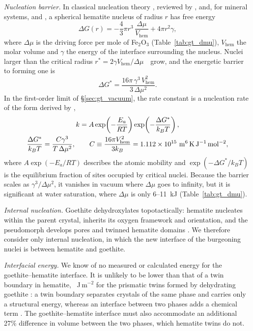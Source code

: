 \textit{Nucleation barrier.} In classical nucleation theory \citep{gibbs1878,volmer1926,becker1935},
reviewed by \citet{christian2002}, \citet{kashchiev2000} and, for mineral systems,
\citet{deyoreo2003} and \citet{lasaga1998}, a spherical hematite nucleus of radius $r$ has free
energy
\begin{equation}
  \Delta G(r) = -\frac{4}{3}\pi r^{3}\,\frac{\Delta\mu}{V_{\mathrm{hem}}} + 4\pi r^{2}\gamma,
\end{equation}
where $\Delta\mu$ is the driving force per mole of Fe$_2$O$_3$ (Table~\ref{tab:gt_dmu}),
$V_{\mathrm{hem}}$ the molar volume and $\gamma$ the energy of the interface surrounding the
nucleus. Nuclei larger than the critical radius $r^{*} = 2\gamma V_{\mathrm{hem}}/\Delta\mu$~~grow,
and the energetic barrier to forming one is
\begin{equation}
  \Delta G^{*} = \frac{16\pi\,\gamma^{3}\,V_{\mathrm{hem}}^{2}}{3\,\Delta\mu^{2}} .
  \label{eq:gt_barrier}
\end{equation}
In the first-order limit of \S\ref{sec:gt_vacuum}, the rate constant is a nucleation rate of the
form derived by \citet{turnbull1949},
\begin{gather}
  k = A\exp\!\left(-\frac{E_a}{RT}\right)\exp\!\left(-\frac{\Delta G^{*}}{k_B T}\right), \notag\\
  \frac{\Delta G^{*}}{k_B T} = \frac{C\gamma^{3}}{T\,\Delta\mu^{2}},
  \qquad
  C \equiv \frac{16\pi V_{\mathrm{hem}}^{2}}{3k_B} = 1.112\times10^{15}~\mathrm{m^6\,K\,J^{-1}\,mol^{-2}} ,
  \label{eq:gt_knuc}
\end{gather}
where $A\exp(-E_a/RT)$ describes the atomic mobility and $\exp(-\Delta G^{*}/k_BT)$ is the
equilibrium fraction of sites occupied by critical nuclei. Because the barrier scales as
$\gamma^3/\Delta\mu^2$, it vanishes in vacuum where $\Delta\mu$ goes to infinity, but it 
is significant at water saturation, where $\Delta\mu$ is only 6--11~kJ
(Table~\ref{tab:gt_dmu}).

\textit{Internal nucleation.} Goethite dehydroxylates topotactically: hematite nucleates within
the parent crystal, inherits its oxygen framework and orientation, and the pseudomorph develops
pores and twinned hematite domains \citep{limadefaria1963,watari1979,watari1983,cudennec2005}.
We therefore consider only internal nucleation, in which the new interface of the burgeoning nuclei is between hematite
and goethite.

\textit{Interfacial energy.} We know of no measured or calculated energy for the goethite--hematite
interface. It is unlikely to be lower than that of a twin boundary in hematite,
\ChTwoKinGammaTwin~J\,m$^{-2}$ for the prismatic twins formed by dehydrating goethite
\citep{saito2016}: a twin boundary separates crystals of the same phase and carries only a
structural energy, whereas an interface between two phases adds a chemical term
\citep{porter2009}. The goethite--hematite interface must also accommodate an additional 27\% difference in volume
between the two phases, which hematite twins do not.

